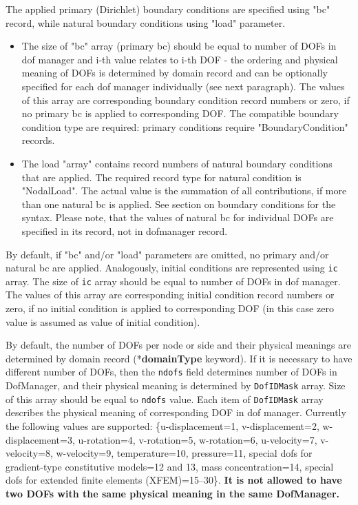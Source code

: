 \documentclass[a4paper]{article}
\newcommand{\param}[1]{\texttt{#1}} %
\newcommand{\entKeyword}[1]{*\textbf{#1}} %
\begin{document}
The applied primary (Dirichlet) boundary conditions are specified using
"bc" record, while natural boundary conditions using "load" parameter.
\begin{itemize}
\item The size of "bc" array (primary bc) should be equal to number of DOFs in dof manager and i-th value relates to i-th DOF - the ordering and physical meaning of DOFs is determined by domain record and can be optionally specified for each dof manager individually (see next paragraph). The values of this array are corresponding boundary condition record numbers or zero, if no primary bc is applied to corresponding DOF. The compatible boundary condition type are required: primary conditions require "BoundaryCondition" records.
\item The load "array" contains record numbers of natural boundary conditions that are applied. The required record type for natural condition is "NodalLoad". The actual value is the summation of all contributions, if more than one natural bc is applied. See section on boundary conditions for the syntax. Please note, that the values of natural bc for individual DOFs are specified in its record, not in dofmanager record.
\end{itemize}

By default, if "bc" and/or "load" parameters are omitted, no primary
and/or natural bc are applied. Analogously, initial conditions are represented using \param{ic} array. The size of \param{ic} array should be equal to number of DOFs in dof manager. The values of this array are corresponding initial condition record numbers or zero, if no initial condition is applied to corresponding DOF (in this case zero value is assumed as value of initial condition).

By default, the number of DOFs per node or side  and their physical meanings are determined by domain record (\entKeyword{domainType} keyword).
If it is necessary to have
different number of DOFs, then the \param{ndofs} field
determines number of DOFs in DofManager, and their physical meaning is
determined by \param{DofIDMask} array. Size of this array
should be equal to \param{ndofs} value. Each item of \param{DofIDMask}
array describes the physical meaning of corresponding DOF in dof manager. Currently
the following values are supported: \{u-displacement=1, v-displacement=2,
 w-displacement=3, u-rotation=4, v-ro\-ta\-tion=5, w-rotation=6, u-velocity=7, v-velocity=8, w-velocity=9,
temperature=10, pressure=11, special dofs for gradient-type constitutive models=12 and 13, mass concentration=14, special dofs for extended finite elements (XFEM)=15--30\}.
\textbf{It is not allowed to have two DOFs with the same physical meaning in the same DofManager.}
\end{document}
